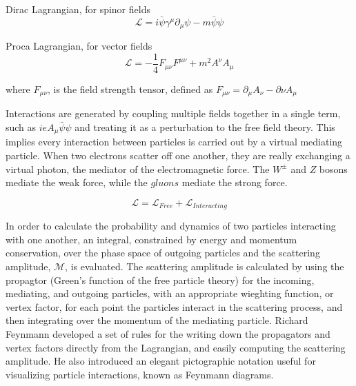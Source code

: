 \noindent Dirac Lagrangian, for spinor fields
\begin{equation}\label{eq:dirac_lagrangian}
\mathcal{L} = i\bar{\psi}\gamma^{\mu}\partial_{\mu}\psi - m\bar{\psi}\psi 
\end{equation}

\noindent Proca Lagrangian, for vector fields
\begin{equation}\label{eq:proca_lagrangian}
\mathcal{L} = -\frac{1}{4}F_{\mu\nu}F^{\mu\nu} + m^{2}A^{\nu}A_{\mu} 
\end{equation}

\noindent where $F_{\mu\nu}$, is the field strength tensor, defined as
$F_{\mu\nu} = \partial_{\mu}A_{\nu} - \partial{\nu}A_{\mu}$

\par Interactions are generated by coupling multiple fields together in a
single term, such as $ieA_{\mu}\bar{\psi}\psi$ and treating it as a
perturbation to the free field theory.  This implies every interaction
between particles is carried out by a virtual mediating particle.  When two
electrons scatter off one another, they are really exchanging a
virtual photon, the mediator of the electromagnetic force.  The
$W^{\pm}$ and $Z$ bosons mediate the weak force, while the $gluons$
mediate the strong force.  

\begin{equation}\label{eq:lagrangian_free_interacting}
\mathcal{L} = \mathcal{L}_{Free} + \mathcal{L}_{Interacting}
\end{equation}

\par In order to calculate the probability and dynamics of two
particles interacting with one another, an integral, constrained by
energy and momentum conservation, over the phase space of outgoing
particles and the scattering amplitude, $\mathcal{M}$, is evaluated.
The scattering amplitude is calculated by using the propagtor (Green's
function of the free particle theory) for the incoming, mediating, and
outgoing particles, with an appropriate wieghting function, or vertex
factor, for each point the particles interact in the scattering
process, and then integrating over the momentum of the mediating
particle.  Richard Feynmann developed a set of rules for the writing
down the propagators and vertex factors directly from the Lagrangian,
and easily computing the scattering amplitude.  He also introduced an
elegant pictographic notation useful for visualizing particle
interactions, known as Feynmann diagrams. 

